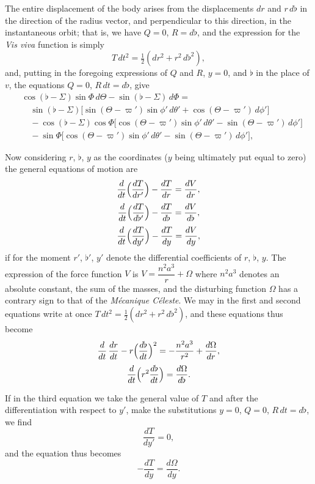 \documentclass[12pt,a4paper]{article}
\theoremstyle{plain}
\begin{document}
The entire displacement of the body arises from the displacements $dr$ and $r\,d\flat$ in the direction of the radius vector, and perpendicular to this direction, in the instantaneous orbit; that is, we have $Q=0$, $R=d\flat$, and the expression for the \textit{Vis viva} function is simply
\[
T\,dt^{2}=\tfrac{1}{2}(dr^{2}+r^{2}\,d\flat^{2}),
\]
and, putting in the foregoing expressions of $Q$ and $R$, $y=0$, and $\flat$ in the place of $v$, the equations $Q=0$, $R\,dt=d\flat$, give
\begin{align*}
&\cos(\flat-\varSigma)\sin\varPhi\,d\Theta-\sin(\flat-\varSigma)\,d\varPhi=\\
&\quad\sin(\flat-\varSigma)\bigl[\sin(\Theta-\varpi')\sin\phi'\,d\theta'+\cos(\Theta-\varpi')\,d\phi'\bigr]\\
&\quad -\cos(\flat-\varSigma)\cos\varPhi\bigl[\cos(\Theta-\varpi')\sin\phi'\,d\theta'-\sin(\Theta-\varpi')\,d\phi'\bigr]\\
&\quad -\sin\varPhi\bigl[\cos(\Theta-\varpi')\sin\phi'\,d\theta'-\sin(\Theta-\varpi')\,d\phi'\bigr],
\end{align*}

\newpage
{} Now considering $r$, $\flat$, $y$ as the coordinates ($y$ being ultimately put equal to zero) the general equations of motion are
\[
\dfrac{d}{dt}\Bigl(\dfrac{dT}{dr'}\Bigr)-\dfrac{dT}{dr}=\dfrac{dV}{dr},
\]
\[
\dfrac{d}{dt}\Bigl(\dfrac{dT}{d\flat'}\Bigr)-\dfrac{dT}{d\flat}=\dfrac{dV}{d\flat},
\]
\[
\dfrac{d}{dt}\Bigl(\dfrac{dT}{dy'}\Bigr)-\dfrac{dT}{dy}=\dfrac{dV}{dy},
\]
if for the moment $r'$, $\flat'$, $y'$ denote the differential coefficients of $r$, $\flat$, $y$. The expression of the force function $V$ is $V=\dfrac{n^{2}a^{3}}{r}+\Omega$ where $n^{2}a^{3}$ denotes an absolute constant, the sum of the masses, and the disturbing function $\Omega$ has a contrary sign to that of the \textit{M\'ecanique C\'eleste}. We may in the first and second equations write at once $T\,dt^{2}=\tfrac{1}{2}(dr^{2}+r^{2}\,d\flat^{2})$, and these equations thus become
\[
\dfrac{d}{dt}\,\dfrac{dr}{dt}-r\Bigl(\dfrac{d\flat}{dt}\Bigr)^{2}=-\dfrac{n^{2}a^{3}}{r^{2}}+\dfrac{d\Omega}{dr},
\]
\[
\dfrac{d}{dt}\Bigl(r^{2}\dfrac{d\flat}{dt}\Bigr)=\dfrac{d\Omega}{d\flat}.
\]

\medskip
If in the third equation we take the general value of $T$ and after the differentiation with respect to $y'$, make the substitutions $y=0$, $Q=0$, $R\,dt=d\flat$, we find
\[
\dfrac{dT}{dy'}=0,
\]
and the equation thus becomes
\[
-\dfrac{dT}{dy}=\dfrac{d\Omega}{dy}.
\]
\end{document}
